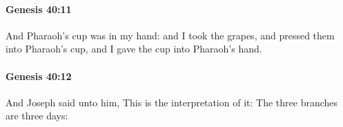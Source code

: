 		\paragraph{Genesis 40:11} %
			\label{GENESIS-40-11}

			And Pharaoh's cup was in my hand: and I took the grapes, and pressed them into Pharaoh's cup, and I gave the cup into Pharaoh's hand.


		\paragraph{Genesis 40:12} %
			\label{GENESIS-40-12}

			And Joseph said unto him, This is the interpretation of it: The three branches are three days:


